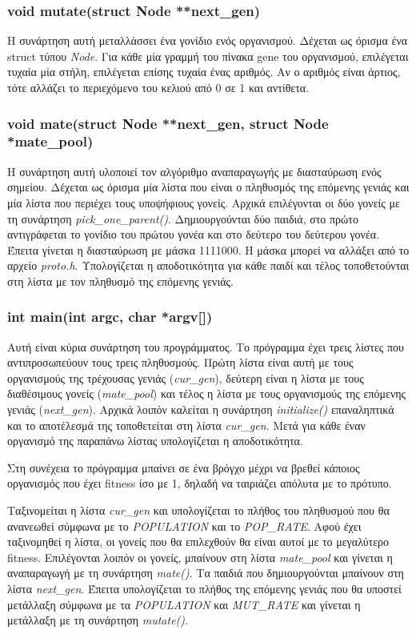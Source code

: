 \documentclass{article}
\begin{document}
\subsubsection{void mutate(struct Node **next\_gen)}
Η συνάρτηση αυτή μεταλλάσσει ένα γονίδιο ενός οργανισμού. Δέχεται ως όρισμα ένα
struct τύπου \emph{Node}. Για κάθε μία γραμμή του πίνακα gene του οργανισμού,
επιλέγεται τυχαία μία στήλη, επιλέγεται επίσης τυχαία ένας αριθμός. Αν ο αριθμός
είναι άρτιος, τότε αλλάζει το περιεχόμενο του κελιού από 0 σε 1 και αντίθετα.
\subsubsection{void mate(struct Node **next\_gen, struct Node *mate\_pool)}
Η συνάρτηση αυτή υλοποιεί τον αλγόριθμο αναπαραγωγής με διασταύρωση ενός
σημείου. Δέχεται ως όρισμα μία λίστα που είναι ο πληθυσμός της επόμενης γενιάς
και μία λίστα που περιέχει τους υποψήφιους γονείς. Αρχικά επιλέγονται οι δύο
γονείς με τη συνάρτηση \emph{pick\_one\_parent()}. Δημιουργούνται δύο παιδιά,
στο πρώτο αντιγράφεται το γονίδιο του πρώτου γονέα και στο δεύτερο του δεύτερου
γονέα. Έπειτα γίνεται η διασταύρωση με μάσκα 1111000. Η μάσκα μπορεί να αλλάξει
από το αρχείο \emph{proto.h}. Υπολογίζεται η αποδοτικότητα για κάθε παιδί και
τέλος τοποθετούνται στη λίστα με τον πληθυσμό της επόμενης γενιάς.
\subsubsection{int main(int argc, char *argv[])}
Αυτή είναι κύρια συνάρτηση του προγράμματος. Το πρόγραμμα έχει τρεις λίστες που
αντιπροσωπεύουν τους τρεις πληθυσμούς. Πρώτη λίστα είναι αυτή με τους
οργανισμούς της τρέχουσας γενιάς (\emph{cur\_gen}), δεύτερη είναι η λίστα με
τους διαθέσιμους γονείς (\emph{mate\_pool}) και τέλος η λίστα με τους
οργανισμούς της επόμενης γενιάς (\emph{next\_gen}). Αρχικά λοιπόν καλείται η
συνάρτηση \emph{initialize()} επαναληπτικά και το αποτέλεσμά της τοποθετείται στη
λίστα \emph{cur\_gen}. Μετά για κάθε έναν οργανισμό της παραπάνω λίστας
υπολογίζεται η αποδοτικότητα.

Στη συνέχεια το πρόγραμμα μπαίνει σε ένα βρόγχο μέχρι να βρεθεί κάποιος
οργανισμός που έχει fitness ίσο με 1, δηλαδή να ταιριάζει απόλυτα με το πρότυπο.

Ταξινομείται η λίστα \emph{cur\_gen} και υπολογίζεται το πλήθος του πληθυσμού που 
θα ανανεωθεί σύμφωνα με το \emph{POPULATION} και το \emph{POP\_RATE}.
Αφού έχει ταξινομηθεί η λίστα, οι γονείς που θα επιλεχθούν θα είναι αυτοί με το
μεγαλύτερο fitness.
Επιλέγονται λοιπόν οι γονείς, μπαίνουν στη λίστα \emph{mate\_pool} και γίνεται η
αναπαραγωγή με τη συνάρτηση \emph{mate()}. Τα παιδιά που δημιουργούνται μπαίνουν
στη λίστα \emph{next\_gen}. Έπειτα υπολογίζεται το πλήθος της επόμενης γενιάς
που θα υποστεί μετάλλαξη σύμφωνα με τα \emph{POPULATION} και \emph{MUT\_RATE}
και γίνεται η μετάλλαξη με τη συνάρτηση \emph{mutate()}.
\end{document}
